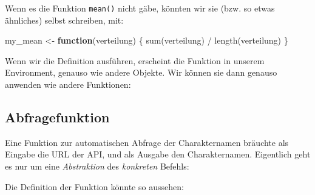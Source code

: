 \documentclass[
  ngerman,
]{article}
\newenvironment{Shaded}{\begin{snugshade}}{\end{snugshade}}
\newcommand{\ControlFlowTok}[1]{\textcolor[rgb]{0.13,0.29,0.53}{\textbf{#1}}}
\newcommand{\DocumentationTok}[1]{\textcolor[rgb]{0.56,0.35,0.01}{\textbf{\textit{#1}}}}
\newcommand{\FunctionTok}[1]{\textcolor[rgb]{0.00,0.00,0.00}{#1}}
\newcommand{\NormalTok}[1]{#1}
\newcommand{\OtherTok}[1]{\textcolor[rgb]{0.56,0.35,0.01}{#1}}
\newcommand{\SpecialCharTok}[1]{\textcolor[rgb]{0.00,0.00,0.00}{#1}}
\newcommand{\StringTok}[1]{\textcolor[rgb]{0.31,0.60,0.02}{#1}}
\begin{document}
Wenn es die Funktion \texttt{mean()} nicht gäbe, könnten wir sie (bzw. so etwas ähnliches) selbst schreiben, mit:

\begin{Shaded}
\begin{Highlighting}[]
\NormalTok{my\_mean }\OtherTok{\textless{}{-}} \ControlFlowTok{function}\NormalTok{(verteilung) \{}
  \FunctionTok{sum}\NormalTok{(verteilung) }\SpecialCharTok{/} \FunctionTok{length}\NormalTok{(verteilung)}
\NormalTok{\}}
\end{Highlighting}
\end{Shaded}

Wenn wir die Definition ausführen, erscheint die Funktion in unserem Environment, genauso wie andere Objekte. Wir können sie dann genauso anwenden wie andere Funktionen:

\begin{Shaded}
\end{Shaded}

\hypertarget{abfragefunktion}{%
\subsection{Abfragefunktion}\label{abfragefunktion}}

Eine Funktion zur automatischen Abfrage der Charakternamen bräuchte als Eingabe die URL der API, und als Ausgabe den Charakternamen. Eigentlich geht es nur um eine \emph{Abstraktion} des \emph{konkreten} Befehls:

\begin{Shaded}
\end{Shaded}

Die Definition der Funktion könnte so aussehen:

\begin{Shaded}
\end{Shaded}
\end{document}
